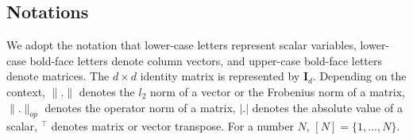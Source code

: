 \documentclass{article}
\theoremstyle{plain}
\theoremstyle{definition}
\theoremstyle{remark}
\begin{document}
\vspace{-0.3cm}
\subsection{Notations}
\label{subsec:notation}
\vspace{-0.3cm}
We adopt the notation that lower-case letters represent scalar variables, lower-case bold-face letters denote column vectors, and upper-case bold-face letters denote matrices. The $d \times d$ identity matrix is represented by $\mathbf{I}_d$. Depending on the context, $\lVert .\rVert$ denotes the $l_2$ norm of a vector or the Frobenius norm of a matrix, $\lVert .\rVert_{op}$ denotes the operator norm of a matrix, $|. |$ denotes the absolute value of a scalar, ${}^\top$ denotes matrix or vector transpose. For a number $N$, $[N] = \{1,\dots, N\}$.

\end{document}
